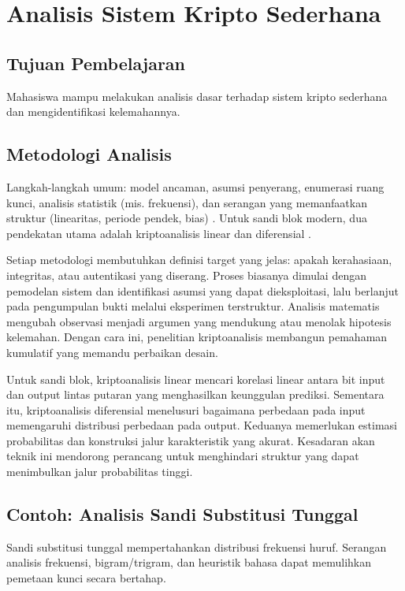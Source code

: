 \documentclass[../main.tex]{subfiles}
\begin{document}
\chapter{Analisis Sistem Kripto Sederhana}

\section{Tujuan Pembelajaran}
Mahasiswa mampu melakukan analisis dasar terhadap sistem kripto sederhana dan mengidentifikasi kelemahannya.

\section{Metodologi Analisis}
Langkah-langkah umum: model ancaman, asumsi penyerang, enumerasi ruang kunci, analisis statistik (mis. frekuensi), dan serangan yang memanfaatkan struktur (linearitas, periode pendek, bias) \citep{stallings}. Untuk sandi blok modern, dua pendekatan utama adalah kriptoanalisis linear dan diferensial \citep{heys_tutorial}.

Setiap metodologi membutuhkan definisi target yang jelas: apakah kerahasiaan, integritas, atau autentikasi yang diserang. Proses biasanya dimulai dengan pemodelan sistem dan identifikasi asumsi yang dapat dieksploitasi, lalu berlanjut pada pengumpulan bukti melalui eksperimen terstruktur. Analisis matematis mengubah observasi menjadi argumen yang mendukung atau menolak hipotesis kelemahan. Dengan cara ini, penelitian kriptoanalisis membangun pemahaman kumulatif yang memandu perbaikan desain.

Untuk sandi blok, kriptoanalisis linear mencari korelasi linear antara bit input dan output lintas putaran yang menghasilkan keunggulan prediksi. Sementara itu, kriptoanalisis diferensial menelusuri bagaimana perbedaan pada input memengaruhi distribusi perbedaan pada output. Keduanya memerlukan estimasi probabilitas dan konstruksi jalur karakteristik yang akurat. Kesadaran akan teknik ini mendorong perancang untuk menghindari struktur yang dapat menimbulkan jalur probabilitas tinggi.

\section{Contoh: Analisis Sandi Substitusi Tunggal}
Sandi substitusi tunggal mempertahankan distribusi frekuensi huruf. Serangan analisis frekuensi, bigram/trigram, dan heuristik bahasa dapat memulihkan pemetaan kunci secara bertahap.
\end{document}
